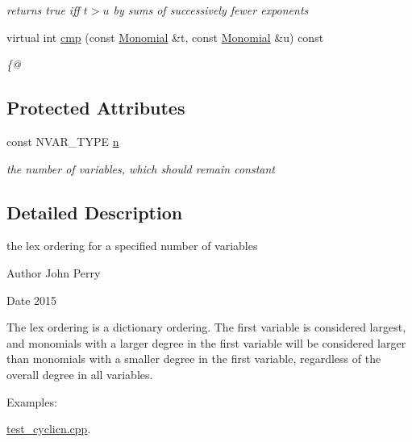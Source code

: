 \begin{Indent}
\begin{DoxyCompactItemize}
\begin{DoxyCompactList}\small\item\em returns {\ttfamily true} iff $t>u$ by sums of successively fewer exponents \end{DoxyCompactList}\item 
virtual int \hyperlink{class_lex___ordering_ac8ff7b60790ed86bad7b24571ff7a3d1}{cmp} (const \hyperlink{class_monomial}{Monomial} \&t, const \hyperlink{class_monomial}{Monomial} \&u) const
\begin{DoxyCompactList}\small\item\em \{@ \end{DoxyCompactList}\end{DoxyCompactItemize}
\end{Indent}
\subsection*{Protected Attributes}
\begin{DoxyCompactItemize}
\item 
\mbox{\label{class_lex___ordering_a5065dfa6430e7fef522edbf762841ab7}} 
const N\+V\+A\+R\+\_\+\+T\+Y\+PE \hyperlink{class_lex___ordering_a5065dfa6430e7fef522edbf762841ab7}{n}
\begin{DoxyCompactList}\small\item\em the number of variables, which should remain constant \end{DoxyCompactList}\end{DoxyCompactItemize}


\subsection{Detailed Description}
the lex ordering for a specified number of variables 

\begin{DoxyAuthor}{Author}
John Perry 
\end{DoxyAuthor}
\begin{DoxyDate}{Date}
2015
\end{DoxyDate}
The lex ordering is a dictionary ordering. The first variable is considered largest, and monomials with a larger degree in the first variable will be considered larger than monomials with a smaller degree in the first variable, regardless of the overall degree in all variables. \begin{Desc}
\item[Examples\+: ]\par
\hyperlink{test_cyclicn_8cpp-example}{test\+\_\+cyclicn.\+cpp}.\end{Desc}


